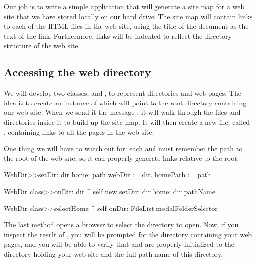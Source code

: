 \documentclass[a4paper,10pt,twoside]{book}
\begin{document}

Our job is to write a simple application that will generate a site map for a web site that we have stored locally on our hard drive.  The site map will contain links to each of the HTML files in the web site, using the title of the document as the text of the link. Furthermore, links will be indented to reflect the directory structure of the web site.

\subsection{Accessing the web directory}


We will develop two classes,  and , to represent directories and web pages.  The idea is to create an instance of  which will point to the root directory containing our web site.  When we send it the message , it will walk through the files and directories inside it to build up the site map.  It will then create a new file, called , containing links to all the pages in the web site.

One thing we will have to watch out for: each  and  must remember the path to the root of the web site, so it can properly generate links relative to the root.


\begin{code}{}
WebDir>>setDir: dir home: path 
	webDir := dir.
	homePath := path

WebDir class>>onDir: dir
	^ self new setDir: dir home: dir pathName

WebDir class>>selectHome
	^ self onDir: FileList modalFolderSelector
\end{code}

The last method opens a browser to select the directory to open.
Now, if you inspect the result of , you will be prompted for the directory containing your web pages, and you will be able to verify that  and  are properly initialized to the directory holding your web site and the full path name of this directory.
\end{document}
